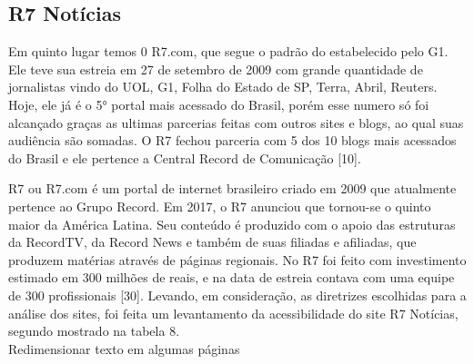 \documentclass[a4paper]{article}
\begin{document}
\begin{titlepage}
\subsection{R7 Notícias}

Em quinto lugar temos 0 R7.com, que segue o padrão do estabelecido pelo G1. Ele teve sua estreia em 27 de setembro de 2009 com grande quantidade de jornalistas vindo do UOL, G1, Folha do Estado de SP, Terra, Abril, Reuters. Hoje, ele já é o 5° portal mais acessado do Brasil, porém esse numero só foi alcançado graças as ultimas parcerias feitas com outros sites e blogs, ao qual suas audiência são somadas. O R7 fechou parceria com 5 dos 10 blogs mais acessados do Brasil e ele pertence a Central Record de Comunicação [10].

R7 ou R7.com é um portal de internet brasileiro criado em 2009 que atualmente pertence ao Grupo Record. Em 2017, o R7 anunciou que tornou-se o quinto maior da América Latina. Seu conteúdo é produzido com o apoio das estruturas da RecordTV, da Record News e também de suas filiadas e afiliadas, que produzem matérias através de páginas regionais. No R7 foi feito com investimento estimado em 300 milhões de reais, e na data de estreia contava com uma equipe de 300 profissionais [30]. Levando, em consideração, as diretrizes escolhidas para a análise dos sites, foi feita um levantamento da acessibilidade do site R7 Notícias, segundo mostrado na tabela 8.\\

Redimensionar texto em algumas páginas


\end{titlepage}
\end{document}
